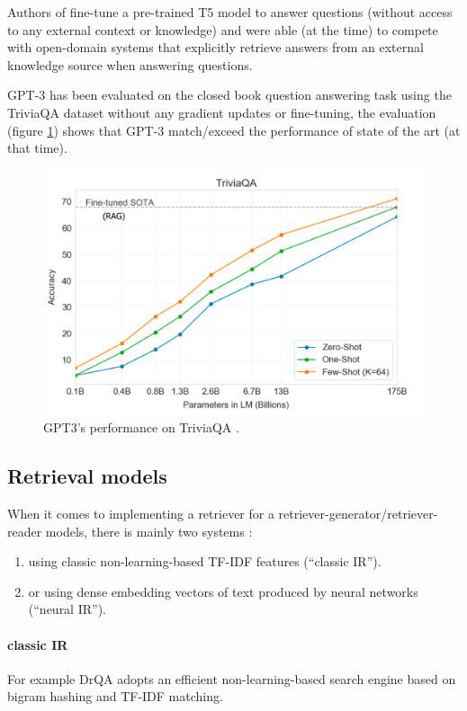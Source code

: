 \documentclass[a4paper,12pt]{article}
\begin{document}
Authors of \cite{T5Qa} fine-tune a pre-trained T5 \cite{T5} model to answer questions
(without access to any external context or knowledge) and were able (at the time) to compete with open-domain systems that
explicitly retrieve answers from an external knowledge source when answering questions.

GPT-3 \cite{gpt3} has been evaluated on the closed book question answering task using the TriviaQA dataset \cite{triviaqa} without any gradient updates or fine-tuning, the evaluation (figure \ref{fig:gpt3}) shows that GPT-3 match/exceed the performance of state of the art (at that time).

\begin{figure}
	\centering
	\includegraphics[width=0.8\linewidth]{figures/gpt3-triviaqa.png}
	\caption{GPT3's performance on TriviaQA \cite{triviaqa}. \cite{gpt3}}
	\label{fig:gpt3}
\end{figure}

\subsection{Retrieval models}
When it comes to implementing a retriever for a retriever-generator/retriever-reader models, there is mainly two systems : 
\begin{enumerate}
	\item using classic non-learning-based TF-IDF features (“classic IR”).
	\item or using dense embedding vectors of text produced by neural networks (“neural IR”).
\end{enumerate}

\paragraph{classic IR}
For example DrQA \cite{drqa} adopts an efficient non-learning-based search engine based on bigram hashing
and TF-IDF matching.
\end{document}
